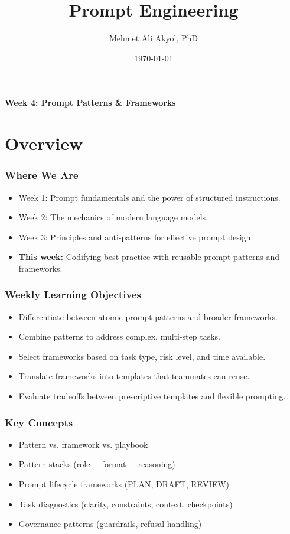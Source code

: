 \documentclass{beamer}
\title{Prompt Engineering}
\author{Mehmet Ali Akyol, PhD}
\institute{Ankara Medipol University}
\date{\today}
\begin{document}
\begin{frame}
    \titlepage
    \begin{center}
        \vspace{1cm}
        \textbf{Week 4: Prompt Patterns \& Frameworks}
    \end{center}
\end{frame}

\section{Overview}

\begin{frame}
    \frametitle{Where We Are}
    \begin{itemize}
        \item Week 1: Prompt fundamentals and the power of structured instructions.
        \item Week 2: The mechanics of modern language models.
        \item Week 3: Principles and anti-patterns for effective prompt design.
        \item \textbf{This week:} Codifying best practice with reusable prompt patterns and frameworks.
    \end{itemize}
\end{frame}

\begin{frame}
    \frametitle{Weekly Learning Objectives}
    \begin{itemize}
        \item Differentiate between atomic prompt patterns and broader frameworks.
        \item Combine patterns to address complex, multi-step tasks.
        \item Select frameworks based on task type, risk level, and time available.
        \item Translate frameworks into templates that teammates can reuse.
        \item Evaluate tradeoffs between prescriptive templates and flexible prompting.
    \end{itemize}
\end{frame}

\begin{frame}
    \frametitle{Key Concepts}
    \begin{itemize}
        \item Pattern vs. framework vs. playbook
        \item Pattern stacks (role + format + reasoning)
        \item Prompt lifecycle frameworks (PLAN, DRAFT, REVIEW)
        \item Task diagnostics (clarity, constraints, context, checkpoints)
        \item Governance patterns (guardrails, refusal handling)
    \end{itemize}
\end{frame}
\end{document}
